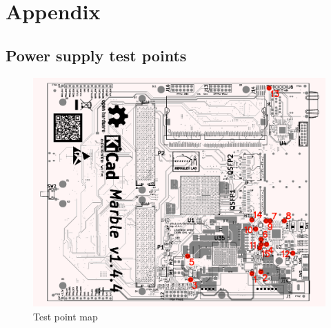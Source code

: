 \documentclass[12pt,oneside,a4]{article}
\begin{document}
\section{Appendix}
\subsection{Power supply test points}

\begin{figure}[H]
\begin{center}
\includegraphics[width=1\linewidth]{testpoint_map.pdf}
 \caption{Test point map}\label{testpoints}
\end{center}
\end{figure}
\end{document}
